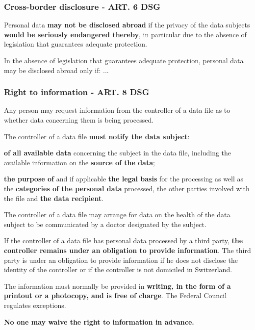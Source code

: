 \subsubsection{Cross-border disclosure - ART. 6 DSG}
\begin{compactenum}	
	\item Personal data \textbf{may not be disclosed abroad} if the privacy of the data subjects \textbf{would be seriously endangered thereby}, in particular due to the absence of legislation that guarantees adequate protection.
	\item In the absence of legislation that guarantees adequate protection, personal data may be disclosed abroad only if: ...
\end{compactenum}	

\subsubsection{Right to information - ART. 8 DSG}
\begin{compactenum}	
	\item Any person may request information from the controller of a data file as to whether data concerning them is being processed.
	\item The controller of a data file \textbf{must notify the data subject}:
	\begin{compactenum}	
		\item \textbf{of all available data} concerning the subject in the data file, including the available information on the \textbf{source of the data};
		\item \textbf{the purpose of} and if applicable \textbf{the legal basis} for the processing as well as the \textbf{categories of the personal data} processed, the other parties involved with the file and \textbf{the data recipient}.
	\end{compactenum}	
	\item The controller of a data file may arrange for data on the health of the data subject to be communicated by a doctor designated by the subject.
	\item If the controller of a data file has personal data processed by a third party, \textbf{the controller remains under an obligation to provide information}. The third party is under an obligation to provide information if he does not disclose the identity of the controller or if the controller is not domiciled in Switzerland.
	\item The information must normally be provided in \textbf{writing, in the form of a printout or a photocopy, and is free of charge}. The Federal Council regulates exceptions.
	\item \textbf{No one may waive the right to information in advance.}
\end{compactenum}
